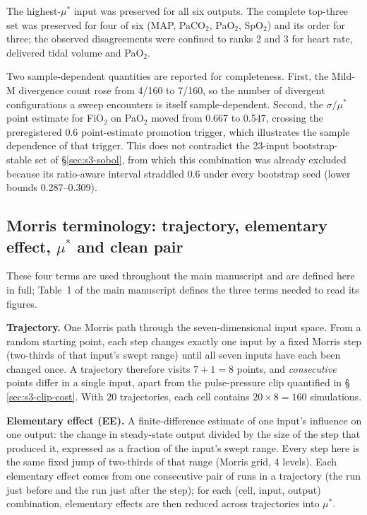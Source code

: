 \documentclass[pdflatex,sn-nature]{sn-jnl}%
\newcommand{\mainref}[2]{#2}
\begin{document}
The highest-$\mu^{*}$ input was preserved for all six outputs. The complete top-three set was preserved for four of six (MAP, PaCO$_2$, PaO$_2$, SpO$_2$) and its order for three; the observed disagreements were confined to ranks 2 and 3 for heart rate, delivered tidal volume and PaO$_2$.

Two sample-dependent quantities are reported for completeness. First, the Mild-M divergence count rose from 4/160 to 7/160, so the number of divergent configurations a sweep encounters is itself sample-dependent. Second, the $\sigma/\mu^{*}$ point estimate for FiO$_2$ on PaO$_2$ moved from 0.667 to 0.547, crossing the preregistered 0.6 point-estimate promotion trigger, which illustrates the sample dependence of that trigger. This does not contradict the 23-input bootstrap-stable set of \S\ref{sec:s3-sobol}, from which this combination was already excluded because its ratio-aware interval straddled 0.6 under every bootstrap seed (lower bounds 0.287--0.309).
\subsection{Morris terminology: trajectory, elementary effect, $\mu^{*}$ and clean pair}\label{sec:s3-terms}

These four terms are used throughout the main manuscript and are defined here in full; Table~\mainref{tab:terms}{1} of the main manuscript defines the three terms needed to read its figures.

\textbf{Trajectory.} One Morris path through the seven-dimensional input space. From a random starting point, each step changes exactly one input by a fixed Morris step (two-thirds of that input's swept range) until all seven inputs have each been changed once. A trajectory therefore visits $7+1 = 8$ points, and \emph{consecutive} points differ in a single input, apart from the pulse-pressure clip quantified in \S\,\ref{sec:s3-clip-cost}. With 20 trajectories, each cell contains $20 \times 8 = 160$ simulations.

\textbf{Elementary effect (EE).} A finite-difference estimate of one input's influence on one output: the change in steady-state output divided by the size of the step that produced it, expressed as a fraction of the input's swept range. Every step here is the same fixed jump of two-thirds of that range (Morris grid, 4 levels). Each elementary effect comes from one consecutive pair of runs in a trajectory (the run just before and the run just after the step); for each (cell, input, output) combination, elementary effects are then reduced across trajectories into $\mu^{*}$.
\end{document}
